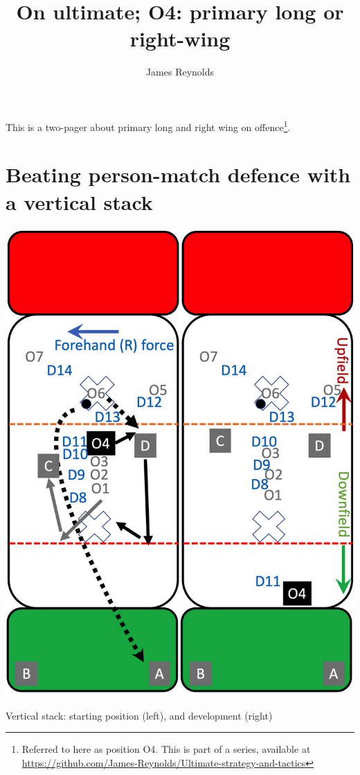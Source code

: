 \documentclass{tufte-handout}
\title{On ultimate; O4: primary long or right-wing}
\author[James Reynolds]{James Reynolds}
\begin{document}
\maketitle%
This is 
a two-pager 
about 
primary long and 
right wing on offence\footnote{
Referred to here 
as position O4. 
This
is part of a series, 
available at
\url{https://github.com/James-Reynolds/Ultimate-strategy-and-tactics}}. 

\section{Beating person-match defence with a vertical stack}\label{sec:vertical}

\begin{marginfigure}%
  \includegraphics[width=\linewidth]{O4-vertical}
  \caption{Vertical stack: 
  starting position (left),
  and development (right)}
  \label{fig:O4-vertical}
\end{marginfigure}
\end{document}
